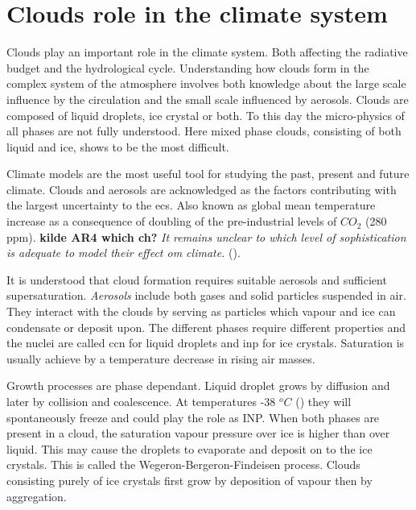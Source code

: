 \section{Clouds role in the climate system} \label{sec:cloud_in_climate_system}
Clouds play an important role in the climate system. Both affecting the radiative budget and the hydrological cycle. Understanding how clouds form in the complex system of the atmosphere involves both knowledge about the large scale influence by the circulation and the small scale influenced by aerosols. Clouds are composed of liquid droplets, ice crystal or both. To this day the micro-physics of all phases are not fully understood. Here mixed phase clouds, consisting of both liquid and ice, shows to be the most difficult. 

Climate models are the most useful tool for studying the past, present and future climate. Clouds and aerosols are acknowledged as the factors contributing with the largest uncertainty to the \acrfull{ecs}. Also known as global mean temperature increase as a consequence of doubling of the pre-industrial levels of $CO_2$ (280 \acrshort{ppm}). \textbf{kilde AR4 which ch?} \textit{It remains unclear to which level of sophistication is adequate to model their effect om climate.} (\cite{IPCC_CH7_clouds}).

It is understood that cloud formation requires suitable aerosols and sufficient supersaturation. \textit{Aerosols} include both gases and solid particles suspended in air. They interact with the clouds by serving as particles which vapour and ice can condensate or deposit upon. The different phases require different properties and the nuclei are called \acrshort{ccn} for liquid droplets and \acrshort{inp} for ice crystals. Saturation is usually achieve by a temperature decrease in rising air masses. %
 
Growth processes are phase dependant. Liquid droplet grows by diffusion and later by collision and coalescence. At temperatures -38 $^oC$ (\cite{lohmann2016}) they will spontaneously freeze and could play the role as INP. When both phases are present in a cloud, the saturation vapour pressure over ice is higher than over liquid. This may cause the droplets to evaporate and deposit on to the ice crystals. This is called the Wegeron-Bergeron-Findeisen process. Clouds consisting purely of ice crystals first grow by deposition of vapour then by aggregation. 

